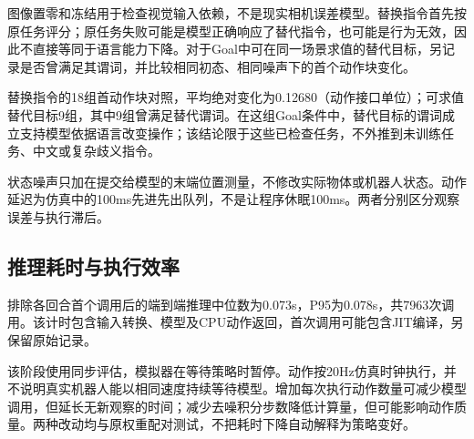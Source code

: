 图像置零和冻结用于检查视觉输入依赖，不是现实相机误差模型。替换指令首先按原任务评分；原任务失败可能是模型正确响应了替代指令，也可能是行为无效，因此不直接等同于语言能力下降。对于Goal中可在同一场景求值的替代目标，另记录是否曾满足其谓词，并比较相同初态、相同噪声下的首个动作块变化。

替换指令的18组首动作块对照，平均绝对变化为0.12680（动作接口单位）；可求值替代目标9组，其中9组曾满足替代谓词。在这组Goal条件中，替代目标的谓词成立支持模型依据语言改变操作；该结论限于这些已检查任务，不外推到未训练任务、中文或复杂歧义指令。


状态噪声只加在提交给模型的末端位置测量，不修改实际物体或机器人状态。动作延迟为仿真中的100ms先进先出队列，不是让程序休眠100ms。两者分别区分观察误差与执行滞后。

\subsection{推理耗时与执行效率}\label{s08-detail-7}

排除各回合首个调用后的端到端推理中位数为0.073s，P95为0.078s，共7963次调用。该计时包含输入转换、模型及CPU动作返回，首次调用可能包含JIT编译，另保留原始记录。

该阶段使用同步评估，模拟器在等待策略时暂停。动作按20Hz仿真时钟执行，并不说明真实机器人能以相同速度持续等待模型。增加每次执行动作数量可减少模型调用，但延长无新观察的时间；减少去噪积分步数降低计算量，但可能影响动作质量。两种改动均与原权重配对测试，不把耗时下降自动解释为策略变好。

